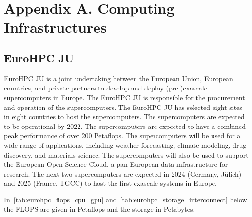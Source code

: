 
\clearpage
\appendix
\section*{Appendix A. Computing Infrastructures}
\label{sec:app:architectures}


\subsection*{EuroHPC JU}
\label{sec:arch:eurohpc-ju}

EuroHPC JU is a joint undertaking between the European Union, European countries, and private partners to develop and deploy (pre-)exascale supercomputers in Europe.
The EuroHPC JU is responsible for the procurement and operation of the supercomputers. The EuroHPC JU has selected eight sites in eight countries to host the supercomputers. The supercomputers are expected to be operational by 2022. The supercomputers are expected to have a combined peak performance of over 200 Petaflops. The supercomputers will be used for a wide range of applications, including weather forecasting, climate modeling, drug discovery, and materials science. The supercomputers will also be used to support the European Open Science Cloud, a pan-European data infrastructure for research.
The next two supercomputers are expected in 2024 (Germany, Jülich) and 2025 (France, TGCC) to host the first exascale systems in Europe.

In~\cref{tab:eurohpc_flops_cpu_gpu} and~\cref{tab:eurohpc_storage_interconnect} below the FLOPS are given in Petaflops and the storage in Petabytes.

